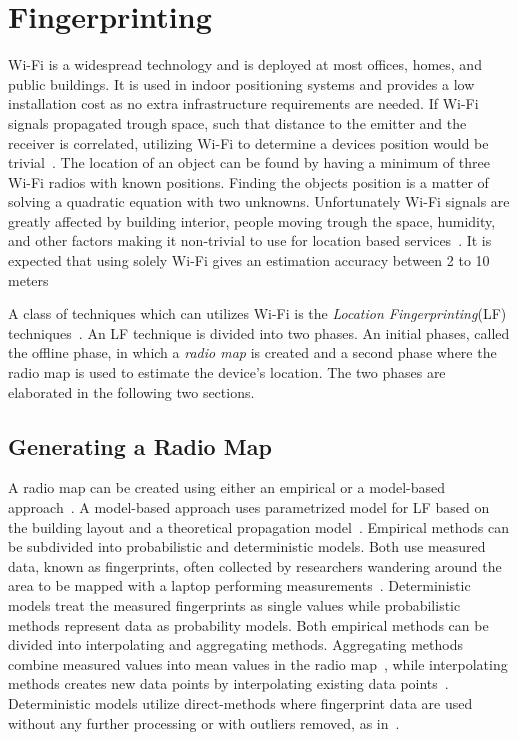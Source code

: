 
\section{Fingerprinting}
\label{wififingerprinting}
Wi-Fi is a widespread technology and is deployed at most offices, homes, and public buildings.
It is used in indoor positioning systems \cite{mlws,5388848,radarlf,Bell2010,6068444} and provides a low installation cost as no extra infrastructure requirements are needed. 
If Wi-Fi signals propagated trough space, such that distance to the emitter and the receiver is correlated, utilizing Wi-Fi to determine a devices position would be trivial~\cite{ariadne2006}. 
The location of an object can be found by having a minimum of three Wi-Fi radios with known positions. 
Finding the objects position is a matter of solving a quadratic equation with two unknowns.  
Unfortunately Wi-Fi signals are greatly affected by building interior, people moving trough the space, humidity, and other factors making it non-trivial to use for location based services~\cite{6068444}.
It is expected that using solely Wi-Fi gives an estimation accuracy between 2 to 10 meters~\cite{6068444,mlws}

A class of techniques which can utilizes Wi-Fi is the \textit{Location Fingerprinting}(LF) techniques~\cite{taxonomy2007}. 
An LF technique is divided into two phases. 
An initial phases, called the offline phase, in which a \textit{radio map} is created and a second phase where the radio map is used to estimate the device's location.
The two phases are elaborated in the following two sections. 

\subsection{Generating a Radio Map}
\label{sub:radiomap}
A radio map can be created using either an empirical or a model-based approach~\cite{taxonomy2007}. 
A model-based approach uses parametrized model for LF based on the building layout and a theoretical propagation model~\cite{radarlf}.   
Empirical methods can be subdivided into probabilistic and deterministic models.  
Both use measured data, known as fingerprints, often collected by researchers wandering around the area to be mapped with a laptop performing measurements~\cite{roblocal2004,5388848, radarlf}.  
Deterministic models treat the measured fingerprints as single values while probabilistic methods represent data as probability models. 
Both empirical methods can be divided into interpolating and aggregating methods. 
Aggregating methods combine measured values into mean values in the radio map~\cite{radarlf, roblocal2004}, while interpolating methods creates new data points by interpolating existing data points~\cite{locadio2004}. 
Deterministic models utilize direct-methods where fingerprint data are used without any further processing or with outliers removed, as in~\cite{1200692}. 

